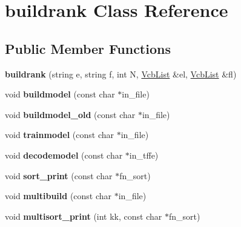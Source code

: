 \hypertarget{classbuildrank}{\section{buildrank \-Class \-Reference}
\label{classbuildrank}
}
\subsection*{\-Public \-Member \-Functions}
\begin{DoxyCompactItemize}
\item 
\hypertarget{classbuildrank_a6b910c015e4b2a85ce8b7288cb290516}{{\bfseries buildrank} (string e, string f, int \-N, \hyperlink{classVcbList}{\-Vcb\-List} \&el, \hyperlink{classVcbList}{\-Vcb\-List} \&fl)}\label{classbuildrank_a6b910c015e4b2a85ce8b7288cb290516}

\item 
\hypertarget{classbuildrank_ab00986eb15e0849c326b9d0db714db0b}{void {\bfseries buildmodel} (const char $\ast$in\-\_\-file)}\label{classbuildrank_ab00986eb15e0849c326b9d0db714db0b}

\item 
\hypertarget{classbuildrank_aefab720075ec671b67c5e2ecf23a67a5}{void {\bfseries buildmodel\-\_\-old} (const char $\ast$in\-\_\-file)}\label{classbuildrank_aefab720075ec671b67c5e2ecf23a67a5}

\item 
\hypertarget{classbuildrank_a1b05955038881fe7223316d271216ae1}{void {\bfseries trainmodel} (const char $\ast$in\-\_\-file)}\label{classbuildrank_a1b05955038881fe7223316d271216ae1}

\item 
\hypertarget{classbuildrank_aac28ed9403f3235e222b75c17b7d4096}{void {\bfseries decodemodel} (const char $\ast$in\-\_\-tffe)}\label{classbuildrank_aac28ed9403f3235e222b75c17b7d4096}

\item 
\hypertarget{classbuildrank_af489d1d73b3b947c989c44237d27ce4f}{void {\bfseries sort\-\_\-print} (const char $\ast$fn\-\_\-sort)}\label{classbuildrank_af489d1d73b3b947c989c44237d27ce4f}

\item 
\hypertarget{classbuildrank_afbe3b0c18a64841584c1c4abf62dedfe}{void {\bfseries multibuild} (const char $\ast$in\-\_\-file)}\label{classbuildrank_afbe3b0c18a64841584c1c4abf62dedfe}

\item 
\hypertarget{classbuildrank_a9475743866d941390bf1ad6a3f41aafd}{void {\bfseries multisort\-\_\-print} (int kk, const char $\ast$fn\-\_\-sort)}\label{classbuildrank_a9475743866d941390bf1ad6a3f41aafd}

\end{DoxyCompactItemize}
